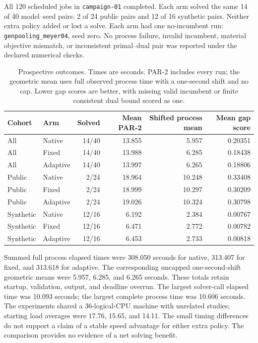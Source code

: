 All 120 scheduled jobs in \texttt{campaign-01} completed. Each arm solved
the same 14 of 40 model--seed pairs: 2 of 24 public pairs and 12 of 16
synthetic pairs. Neither extra policy added or lost a solve. Each arm
had one no-incumbent run: \texttt{genpooling\_meyer04}, seed zero.
No process failure, invalid incumbent, material objective mismatch, or
inconsistent primal--dual pair was reported under the declared numerical
checks.

\begin{table}[htbp]
\centering
\small
\begin{tabular}{@{}llrrrr@{}}
\toprule
Cohort & Arm & Solved & Mean PAR-2 & Shifted process mean & Mean gap score\\
\midrule
All & Native & 14/40 & 13.855 & 5.957 & 0.20351\\
All & Fixed & 14/40 & 13.988 & 6.285 & 0.18438\\
All & Adaptive & 14/40 & 13.997 & 6.265 & 0.18806\\
\addlinespace
Public & Native & 2/24 & 18.964 & 10.248 & 0.33408\\
Public & Fixed & 2/24 & 18.999 & 10.297 & 0.30209\\
Public & Adaptive & 2/24 & 19.026 & 10.324 & 0.30798\\
\addlinespace
Synthetic & Native & 12/16 & 6.192 & 2.384 & 0.00767\\
Synthetic & Fixed & 12/16 & 6.471 & 2.772 & 0.00782\\
Synthetic & Adaptive & 12/16 & 6.453 & 2.733 & 0.00818\\
\bottomrule
\end{tabular}
\caption{Prospective outcomes. Times are seconds. PAR-2 includes every
run; the geometric mean uses full observed process time with a one-second
shift and no cap. Lower gap scores are better, with
missing valid incumbent or finite consistent dual bound scored as one.}
\label{tab:campaign}
\end{table}

Summed full process elapsed times were 308.050 seconds for native,
313.407 for fixed, and 313.618 for adaptive. The corresponding uncapped
one-second-shift geometric means were 5.957, 6.285, and 6.265 seconds.
These totals retain startup, validation, output, and deadline overrun.
The largest solver-call elapsed time was 10.093 seconds; the largest
complete process time was 10.606 seconds. The experiments shared a
36-logical-CPU machine with unrelated studies; starting load averages
were 17.76, 15.65, and 14.11. The small timing differences do not support
a claim of a stable speed advantage for either extra policy. The
comparison provides no evidence of a net solving benefit.

